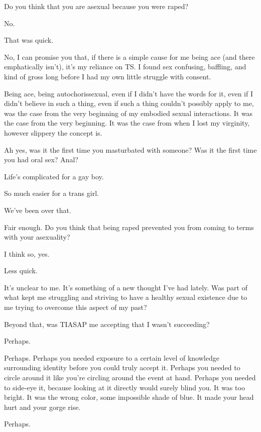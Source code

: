 \begin{ally}
Do you think that you are asexual because you were raped?
\end{ally}
No.

\begin{ally}
That was quick.
\end{ally}
No, I can promise you that, if there is a simple cause for me being ace (and there emphatically isn't), it's my reliance on TS. I found sex confusing, baffling, and kind of gross long before I had my own little struggle with consent.

Being ace, being autochorissexual, even if I didn't have the words for it, even if I didn't believe in such a thing, even if such a thing couldn't possibly apply to me, was the case from the very beginning of my embodied sexual interactions. It was the case from the very beginning. It was the case from when I lost my virginity, however slippery the concept is.

\begin{ally}
Ah yes, was it the first time you masturbated with someone? Was it the first time you had oral sex? Anal?
\end{ally}
Life's complicated for a gay boy.

\begin{ally}
So much easier for a trans girl.
\end{ally}
We've been over that.

\begin{ally}
Fair enough. Do you think that being raped prevented you from coming to terms with your asexuality?
\end{ally}
I think so, yes.

\begin{ally}
Less quick.
\end{ally}
It's unclear to me. It's something of a new thought I've had lately. Was part of what kept me struggling and striving to have a healthy sexual existence due to me trying to overcome this aspect of my past?

Beyond that, was TIASAP me accepting that I wasn't succeeding?

Perhaps.

\begin{ally}
Perhaps. Perhaps you needed exposure to a certain level of knowledge surrounding identity before you could truly accept it. Perhaps you needed to circle around it like you're circling around the event at hand. Perhaps you needed to side-eye it, because looking at it directly would surely blind you. It was too bright. It was the wrong color, some impossible shade of blue. It made your head hurt and your gorge rise.
\end{ally}
Perhaps.
\newpage

